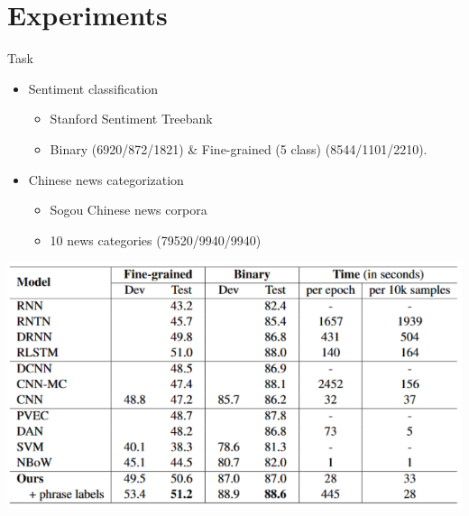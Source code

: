 \documentclass[compress]{beamer}
\begin{document}
\section{Experiments}
\begin{frame}[allowframebreaks]{\secname}
    \begin{block}{Task}
        \begin{itemize}
            \item Sentiment classification 
                \begin{itemize}
                    \item Stanford Sentiment Treebank
                    \item Binary (6920/872/1821) \& Fine-grained (5 class) (8544/1101/2210). 
                \end{itemize}
            \item Chinese news categorization
                \begin{itemize}
                    \item Sogou Chinese news corpora
                    \item 10 news categories (79520/9940/9940)
                \end{itemize}
        \end{itemize}
    \end{block}
    \framebreak
        \includegraphics[width=\textwidth]{performance.png}
\end{frame}
\end{document}
